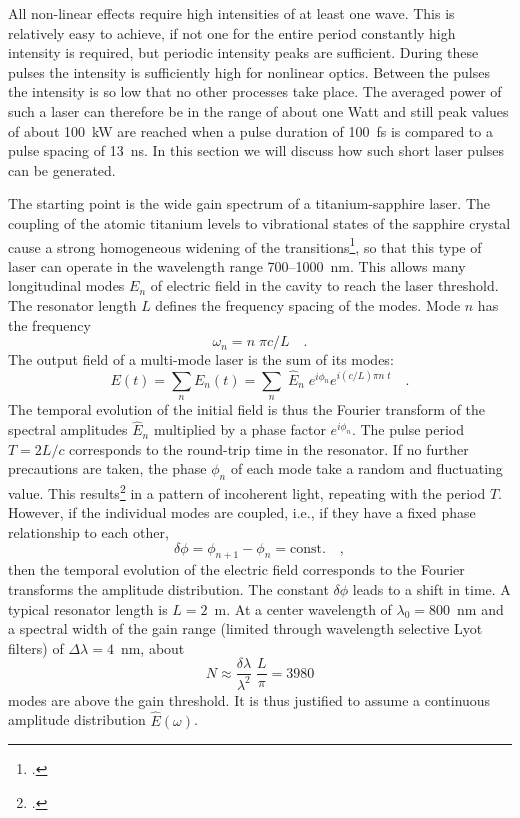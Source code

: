 All non-linear effects  require high
intensities of at least one wave. This 
is relatively
easy to achieve, if not one for the entire period
constantly high intensity is required, but periodic
intensity peaks are sufficient. During these pulses the
intensity  is sufficiently high for nonlinear optics. Between the pulses 
the intensity is so low that no other processes take place. The averaged power of such a laser can therefore
be in the range of about one Watt and still 
peak values of about 100~kW are reached when a pulse duration of
100~fs is compared to a pulse spacing of 13~ns. In
this section we will discuss how such short
laser pulses can be generated.


The starting point is the  wide gain spectrum of a
titanium-sapphire laser. The coupling of the atomic titanium levels to
vibrational states of the sapphire crystal cause a strong
homogeneous widening of the transitions\footcite[chapter 4]{Rulliere2005}, so that
this type of laser can operate in the wavelength range 700--1000~nm. This allows many longitudinal modes $E_n$  of
electric field in the cavity  to reach the laser threshold. The resonator length $L$ defines the frequency spacing of the
modes. Mode $n$ has the frequency 
\begin{equation}
 \omega_n = n \; \pi c / L \quad.
\end{equation}
The output field of a multi-mode laser is the sum of its
modes:
\begin{equation}
  E(t) = \sum_n E_n(t) = \sum_n \; \hat{E}_n \; e^{i \phi_n} e^{i (c/L) \pi n \; t} \quad .
\end{equation}
The temporal evolution of the initial field is thus  the Fourier transform of the  spectral amplitudes $\hat{E}_n$ multiplied by a phase factor $e^{i \phi_n} $. The pulse period  $T = 2L /c$  corresponds to the round-trip  time in the resonator.
If no further precautions are taken, the
phase $\phi_n$ of each mode take a random  and fluctuating value. This
results\footcite{DielsRudolph1996} in a  pattern of incoherent light, repeating with the period $T$.
However, if the individual modes are coupled, i.e., if they 
have a fixed phase relationship to each other,
\begin{equation}
   \delta \phi = \phi_{n+1} - \phi_n = \text{const.} \quad,
   \label{gl_theo_nlo_ml_phiconst}
\end{equation}
then the temporal evolution of the electric field corresponds to the
Fourier transforms the amplitude distribution. The constant
$\delta \phi$ leads to a shift in  time. A typical resonator length is $L = 2$~m. At
a center wavelength of $\lambda_0 = 800$~nm and a
spectral width of the gain range (limited through 
wavelength selective Lyot filters) of $\Delta \lambda =
4$~nm, about
\begin{equation}
 N \approx \frac{\delta \lambda}{ \lambda^2} \; \frac{L}{\pi} =
 3980
\end{equation}
modes are above the gain threshold. It is thus justified to assume  a
continuous amplitude distribution $\hat{E}(\omega)$.

